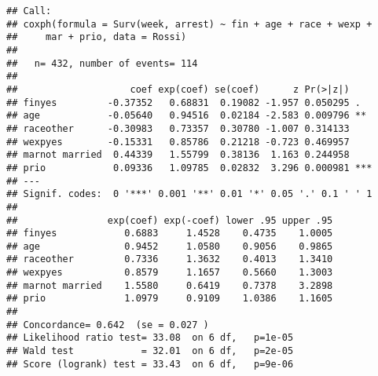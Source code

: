 \documentclass[
]{article}
\begin{document}
\begin{verbatim}
## Call:
## coxph(formula = Surv(week, arrest) ~ fin + age + race + wexp + 
##     mar + prio, data = Rossi)
## 
##   n= 432, number of events= 114 
## 
##                    coef exp(coef) se(coef)      z Pr(>|z|)    
## finyes         -0.37352   0.68831  0.19082 -1.957 0.050295 .  
## age            -0.05640   0.94516  0.02184 -2.583 0.009796 ** 
## raceother      -0.30983   0.73357  0.30780 -1.007 0.314133    
## wexpyes        -0.15331   0.85786  0.21218 -0.723 0.469957    
## marnot married  0.44339   1.55799  0.38136  1.163 0.244958    
## prio            0.09336   1.09785  0.02832  3.296 0.000981 ***
## ---
## Signif. codes:  0 '***' 0.001 '**' 0.01 '*' 0.05 '.' 0.1 ' ' 1
## 
##                exp(coef) exp(-coef) lower .95 upper .95
## finyes            0.6883     1.4528    0.4735    1.0005
## age               0.9452     1.0580    0.9056    0.9865
## raceother         0.7336     1.3632    0.4013    1.3410
## wexpyes           0.8579     1.1657    0.5660    1.3003
## marnot married    1.5580     0.6419    0.7378    3.2898
## prio              1.0979     0.9109    1.0386    1.1605
## 
## Concordance= 0.642  (se = 0.027 )
## Likelihood ratio test= 33.08  on 6 df,   p=1e-05
## Wald test            = 32.01  on 6 df,   p=2e-05
## Score (logrank) test = 33.43  on 6 df,   p=9e-06
\end{verbatim}
\end{document}
